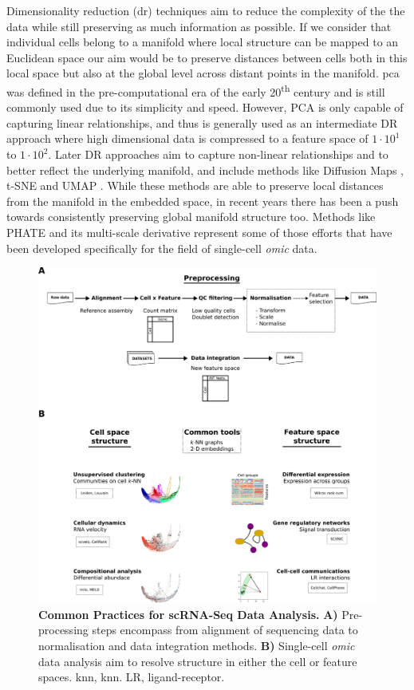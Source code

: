 Dimensionality reduction (\acrshort{dr}) techniques aim to reduce the complexity of the the data while still preserving as much information as possible. If we consider that individual cells belong to a manifold where local structure can be mapped to an Euclidean space our aim would be to preserve distances between cells both in this local space but also at the global level across distant points in the manifold. \acrfull{pca} \cite{pearson_liii_1901,jolliffe_principal_2016} was defined in the pre-computational era of the early 20\textsuperscript{th} century and is still commonly used due to its simplicity and speed. However, PCA is only capable of capturing linear relationships, and thus is generally used as an intermediate DR approach where high dimensional data is compressed to a feature space of \(1\cdot10^1\) to \(1\cdot10^2\). Later DR approaches aim to capture non-linear relationships and to better reflect the underlying manifold, and include methods like Diffusion Maps \cite{coifman_diffusion_2006}, t-SNE \cite{van_der_maaten_visualizing_2008} and UMAP \cite{mcinnes_umap_2020}. While these methods are able to preserve local distances from the manifold in the embedded space, in recent years there has been a push towards consistently preserving global manifold structure too. Methods like PHATE \cite{moon_visualizing_2019} and its multi-scale derivative \cite{kuchroo_multiscale_2020} represent some of those efforts that have been developed specifically for the field of single-cell \emph{omic} data.

\begin{figure}[H]
    \centering
    \includegraphics{01intro/figs/1COMP_analysis.png}
    \caption{\textbf{Common Practices for scRNA-Seq Data Analysis.} \textbf{A)} Pre-processing steps encompass from alignment of sequencing data to normalisation and data integration methods. \textbf{B)} Single-cell \emph{omic} data analysis aim to resolve structure in either the cell or feature spaces. \acrshort{knn}, \acrlong{knn}. LR, ligand-receptor.}
    \label{fig:1pipe}
\end{figure}

